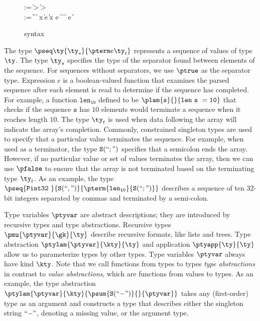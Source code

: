\begin{figure}
\begin{bnf}
   \meta{\gk} \::= \kty \| \ity \-> \gk 
                               \| \kty \-> \gk \\
   \meta{\ty} \::= 
    \ptrue\| \pfalse \|  \| 
    \plam{\var}{\ity}{\ty} \|  \nlalt
    \psig x \ty \ty \| \psum \ty e \ty \| \pand \ty \ty \|
    \pset x \ty e \| \pseq \ty {} \nlalt
    \ptyvar       \| \pmu{\ptyvar}{\gk}{\ty} \| \ptylam{\ptyvar}{\kty}{\ty} \| \ptyapp{\ty}{\ty}
    \nlalt \pcompute e \ity \| \pabsorb \ty \| \pscan{\ty}  
\end{bnf}
\caption{\ddc{} syntax}
\label{fig:ddca-syntax}
\end{figure}

The type $\pseq \ty {\ty_s} {\pterm e {\ty_t}}$ represents a sequence
of values of type $\ty$. The type $\ty_s$ specifies the type of the
separator found between elements of the sequence. For sequences
without separators, we use $\ptrue$ as the separator type.  Expression
$e$ is a boolean-valued function that examines the parsed sequence
after each element is read to determine if the sequence has completed.
For example, a function $\mathtt{len_{10}}$ defined to be 
$\mathtt{ \plam {s}{}{len\ s \ = 10}}$ that 
checks if the sequence $\mathtt{s}$ has $10$ elements 
would terminate a sequence when it reaches length $10$.  The type
$\ty_t$ is used when data following the array will indicate the array's completion.
Commonly, constrained singleton types are used to specify that a particular
value terminates the sequence.  For example, when used as a
terminator, the type $\mathtt{S(``;")}$ specifies
that a semicolon ends the 
array. However, if no particular value or set of values terminates the
array, then we can use $\pfalse$
to ensure that the array is not terminated based on the terminating
type $\ty_t$.  
As an example, the type  
$\pseq {\mathtt{Pint32\ }} {\mathtt{S(``,")}} {\pterm {\mathtt{len_{10}}} {{\mathtt{S(``;")}}}}$
describes a sequence of ten 32-bit integers separated by commas and 
terminated by a semi-colon.

Type variables $\ptyvar$ are abstract descriptions; they are
introduced by recursive types and type abstractions. Recursive types
$\pmu{\ptyvar}{\gk}{\ty}$ describe recursive formats, like lists and
trees. Type abstraction $\ptylam{\ptyvar}{\kty}{\ty}$ and application
$\ptyapp{\ty}{\ty}$ allow us to parameterize types by other types.
Type variables $\ptyvar$ always have kind $\kty$. Note that we call
functions from types to types {\em type abstractions} in contrast to
{\em value abstractions}, which are functions from values to types.
As an example,
the type abstraction 
$\ptylam{\ptyvar}{\kty}{\psum{\mathtt{S}(``{-}")}{}{\ptyvar} }$ 
takes any (first-order) type as an argument and 
constructs a type that describes either the
singleton string $``\mathtt{-}"$, denoting a missing value, or the argument type.

